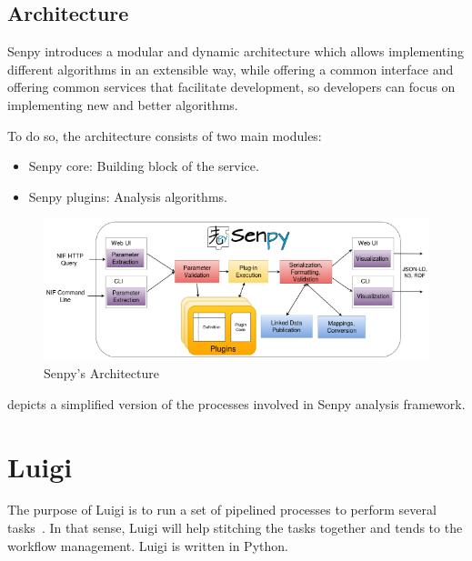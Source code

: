 \subsection{Architecture}
Senpy introduces a modular and dynamic architecture which allows implementing different algorithms in an extensible way, while offering a common interface and offering common services that facilitate development, so developers can focus on implementing new and better algorithms.\par
To do so, the architecture consists of two main modules:
\begin{itemize}
	\item Senpy core: Building block of the service.
	\item Senpy plugins: Analysis algorithms.
\end{itemize}
\begin{figure}
	\includegraphics[width=\linewidth]{img/senpy_architecture.png}
	\caption{Senpy's Architecture~\cite{senpy}}
	\label{fig:senpyarch}
\end{figure}
 depicts a simplified version of the processes involved in Senpy analysis framework.

\section{Luigi}
The purpose of Luigi is to run a set of pipelined processes to perform several tasks~\cite{luigi}. In that sense, Luigi will help stitching the tasks together and tends to the workflow management. Luigi is written in Python.\par
